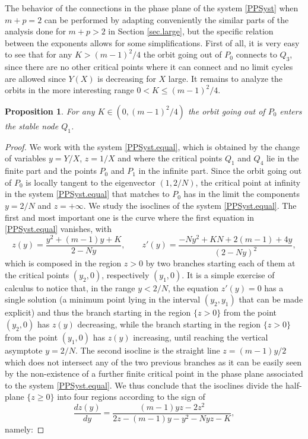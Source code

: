 \documentclass[a4paper,11pt]{article}
\newtheorem{proposition}[theorem]{Proposition}
\numberwithin{equation}{section}
\begin{document}
The behavior of the connections in the phase plane of the system \eqref{PPSyst} when $m+p=2$ can be performed by adapting conveniently the similar parts of the analysis done for $m+p>2$ in Section \ref{sec.large}, but the specific relation between the exponents allows for some simplifications. First of all, it is very easy to see that for any $K>(m-1)^2/4$ the orbit going out of $P_0$ connects to $Q_3$, since there are no other critical points where it can connect and no limit cycles are allowed since $Y(X)$ is decreasing for $X$ large. It remains to analyze the orbits in the more interesting range $0<K\leq(m-1)^2/4$.
\begin{proposition}\label{prop.equal}
For any $K\in(0,(m-1)^2/4)$ the orbit going out of $P_0$ enters the stable node $Q_1$.
\end{proposition}
\begin{proof}
We work with the system \eqref{PPSyst.equal}, which is obtained by the change of variables $y=Y/X$, $z=1/X$ and where the critical points $Q_1$ and $Q_4$ lie in the finite part and the points $P_0$ and $P_1$ in the infinite part. Since the orbit going out of $P_0$ is locally tangent to the eigenvector $(1,2/N)$, the critical point at infinity in the system \eqref{PPSyst.equal} that matches to $P_0$ has in the limit the components $y=2/N$ and $z=+\infty$. We study the isoclines of the system \eqref{PPSyst.equal}. The first and most important one is the curve where the first equation in \eqref{PPSyst.equal} vanishes, with
\begin{equation}\label{interm17}
z(y)=\frac{y^2+(m-1)y+K}{2-Ny}, \qquad z'(y)=\frac{-Ny^2+KN+2(m-1)+4y}{(2-Ny)^2},
\end{equation}
which is composed in the region $z>0$ by two branches starting each of them at the critical points $(y_2,0)$, respectively $(y_1,0)$. It is a simple exercise of calculus to notice that, in the range $y<2/N$, the equation $z'(y)=0$ has a single solution (a minimum point lying in the interval $(y_2,y_1)$ that can be made explicit) and thus the branch starting in the region $\{z>0\}$ from the point $(y_2,0)$ has $z(y)$ decreasing, while the branch starting in the region $\{z>0\}$ from the point $(y_1,0)$ has $z(y)$ increasing, until reaching the vertical asymptote $y=2/N$. The second isocline is the straight line $z=(m-1)y/2$ which does not intersect any of the two previous branches as it can be easily seen by the non-existence of a further finite critical point in the phase plane associated to the system \eqref{PPSyst.equal}. We thus conclude that the isoclines divide the half-plane $\{z\geq0\}$ into four regions according to the sign of
$$
\frac{dz(y)}{dy}=\frac{(m-1)yz-2z^2}{2z-(m-1)y-y^2-Nyz-K},
$$
namely:


\end{proof}
\end{document}
